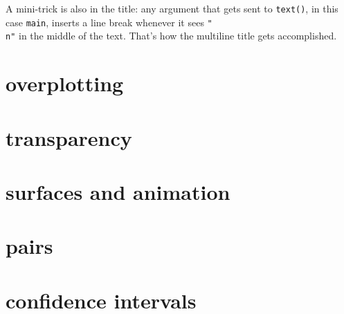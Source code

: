 \documentclass[a4paper]{article}
\begin{document}
A mini-trick is also in the title: any argument that gets sent to \texttt{text()}, in this case \texttt{main}, inserts a line break whenever it sees \texttt{"\\n"} in the middle of the text. That's how the multiline title gets accomplished.

\section{overplotting}
\section{transparency}
\section{surfaces and animation}
\section{pairs}
\section{confidence intervals}
\end{document}
